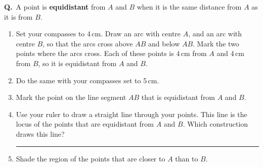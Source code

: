 \documentclass[12pt,a4paper]{article}
\newcounter{qn}
\newcommand{\q}{\refstepcounter{qn}\textbf{Q\theqn.}\ }
\newcommand{\wline}{\par\vspace{16pt}\noindent\rule{\linewidth}{0.4pt}}
\newcommand{\pt}[3]{\fill #1 circle (1.5pt); \node[lab,#2] at #1 {$#3$};}
\begin{document}
\noindent
\begin{minipage}[t]{0.55\linewidth}\raggedright
\q A point is \textbf{equidistant} from $A$ and $B$ when it is the
same distance from $A$ as it is from $B$.
\begin{enumerate}
  \item Set your compasses to 4\,cm. Draw an arc with centre $A$, and
    an arc with centre $B$, so that the arcs cross above $AB$ and below
    $AB$. Mark the two points where the arcs cross. Each of these
    points is 4\,cm from $A$ and 4\,cm from $B$, so it is equidistant
    from $A$ and $B$.
  \item Do the same with your compasses set to 5\,cm.
  \item Mark the point on the line segment $AB$ that is equidistant
    from $A$ and $B$.
  \item Use your ruler to draw a straight line through your points.
    This line is the locus of the points that are equidistant from $A$
    and $B$. Which construction draws this line?
    \wline
  \item Shade the region of the points that are closer to $A$ than
    to $B$.
\end{enumerate}
\end{minipage}\hfill
\begin{minipage}[t]{0.42\linewidth}\raggedright
\centering
{}
\end{minipage}

\vfill
\newpage

\end{document}
